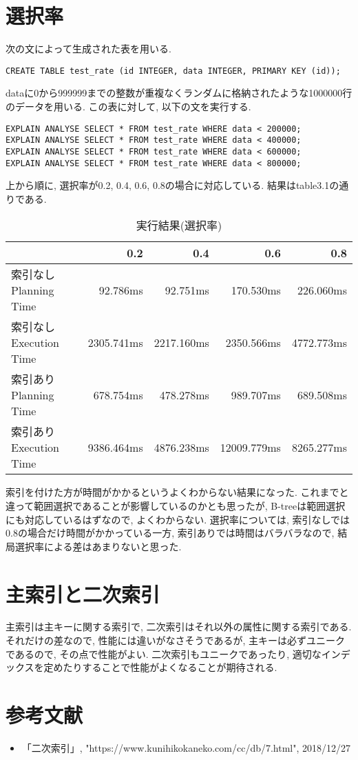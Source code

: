 \documentclass{jarticle}
\begin{document}
\section{選択率}
次の文によって生成された表を用いる.
\begin{verbatim}
CREATE TABLE test_rate (id INTEGER, data INTEGER, PRIMARY KEY (id));
\end{verbatim}
dataに0から999999までの整数が重複なくランダムに格納されたような1000000行のデータを用いる. この表に対して, 以下の文を実行する.
\begin{verbatim}
EXPLAIN ANALYSE SELECT * FROM test_rate WHERE data < 200000;
EXPLAIN ANALYSE SELECT * FROM test_rate WHERE data < 400000;
EXPLAIN ANALYSE SELECT * FROM test_rate WHERE data < 600000;
EXPLAIN ANALYSE SELECT * FROM test_rate WHERE data < 800000;
\end{verbatim}
上から順に, 選択率が0.2, 0.4, 0.6, 0.8の場合に対応している. 結果はtable3.1の通りである.
\begin{table}[htbp]
  \begin{tabular}{|l||r|r|r|r|} \hline
  & 0.2 & 0.4 & 0.6 & 0.8 \\ \hline \hline
  索引なし Planning Time & 92.786ms & 92.751ms & 170.530ms & 226.060ms \\ \hline
  索引なし Execution Time & 2305.741ms & 2217.160ms & 2350.566ms & 4772.773ms \\ \hline
  索引あり Planning Time & 678.754ms & 478.278ms & 989.707ms & 689.508ms \\ \hline
  索引あり Execution Time & 9386.464ms & 4876.238ms & 12009.779ms & 8265.277ms \\ \hline
  \end{tabular}
  \centering
  \caption{実行結果(選択率)}
\end{table}
索引を付けた方が時間がかかるというよくわからない結果になった. これまでと違って範囲選択であることが影響しているのかとも思ったが, B-treeは範囲選択にも対応しているはずなので, よくわからない. 選択率については, 索引なしでは0.8の場合だけ時間がかかっている一方, 索引ありでは時間はバラバラなので, 結局選択率による差はあまりないと思った.
\section{主索引と二次索引}
主索引は主キーに関する索引で, 二次索引はそれ以外の属性に関する索引である. それだけの差なので, 性能には違いがなさそうであるが, 主キーは必ずユニークであるので, その点で性能がよい. 二次索引もユニークであったり, 適切なインデックスを定めたりすることで性能がよくなることが期待される.

\section{参考文献}
\begin{itemize}
\item 「二次索引」, "https://www.kunihikokaneko.com/cc/db/7.html", 2018/12/27
\end{itemize}
\end{document}
